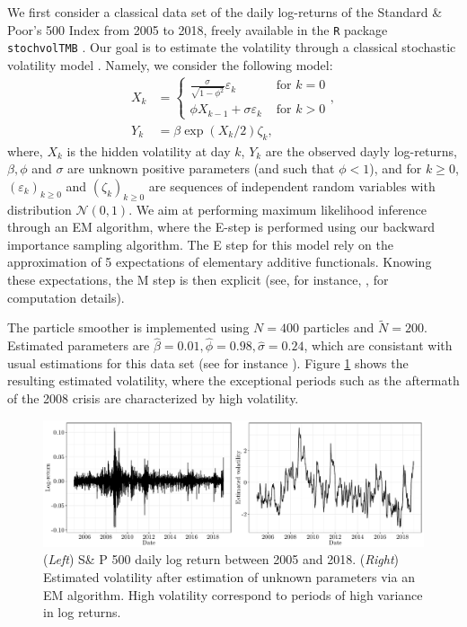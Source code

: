 \documentclass[12pt]{article}
\begin{document}
We first consider a classical data set of the daily log-returns of the Standard \& Poor's 500 Index from 2005 to 2018, freely available in the \texttt{R} package \texttt{stochvolTMB} \citep{wahl2021stochvolTMB}. 
Our goal is to estimate the volatility through a classical stochastic volatility model \citep{taylor1982financial}. Namely, we consider the following model:
\begin{align*}
X_k &= \left\lbrace 
\begin{array}{lr}
\frac{\sigma}{\sqrt{1 - \phi^2}}\varepsilon_k & \text{ for } k = 0\\
\phi X_{k-1} + \sigma  \varepsilon_k 
& \text{ for } k > 0
\end{array}
\right., \\
Y_k &= \beta\exp\left(X_k/2\right)\zeta_k,
\end{align*}
 where, $X_k$ is the hidden volatility at day $k$, $Y_k$ are the observed dayly log-returns, $\beta, \phi$ and $\sigma$ are unknown positive parameters (and such that $\phi < 1$), and for  $k \geqslant 0$, $(\varepsilon_k)_{k\geqslant0}$ and $(\zeta_k)_{k\geqslant0}$ are sequences of independent random variables with distribution $\mathcal{N}(0, 1)$.
 We aim at performing maximum likelihood inference through an EM algorithm, where the E-step is performed using our backward importance sampling algorithm. 
 The E step for this model rely on the approximation of 5 expectations of elementary additive functionals. Knowing these expectations, the M step is then explicit (see, for instance, \citealp[Chapter 12]{douc2014nonlinear}, for computation details).

The particle smoother is implemented using $N = 400$ particles and $\tilde{N}=200$. 
 Estimated parameters are $\hat{\beta} = 0.01, \hat{\phi} = 0.98, \hat{\sigma} = 0.24$, which are consistant with usual estimations for this data set (see for instance \cite{wahl2021stochvolTMB}).  Figure \ref{fig:stoch:vol} shows the resulting estimated volatility, where the exceptional periods such as the aftermath of the 2008 crisis are characterized by high volatility.
 
\begin{figure}
\begin{center}
\includegraphics[height = .333\textwidth]{FigureSup.pdf}
\end{center}
\caption{\label{fig:stoch:vol} (\textit{Left}) S\& P 500 daily log return between 2005 and 2018. (\textit{Right}) Estimated volatility after estimation of unknown parameters via an EM algorithm. High volatility correspond to periods of high variance in log returns.}
\end{figure} 
\end{document}
